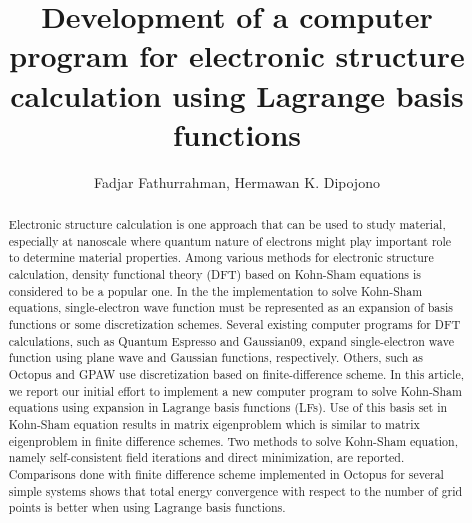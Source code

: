 \documentclass[%
reprint,
amsmath,
amssymb,
aps]{revtex4-1}
\begin{document}
\title{Development of a computer program for electronic structure calculation using Lagrange basis functions}
\author{Fadjar Fathurrahman, Hermawan K. Dipojono}

\begin{abstract}
Electronic structure calculation is one approach that can be used to study material,
especially at nanoscale where quantum nature of electrons might play important role
to determine material properties. Among various methods for electronic structure calculation,
density functional theory (DFT) based on Kohn-Sham equations is considered to be a popular one.
In the the implementation to solve Kohn-Sham equations, single-electron wave function must be
represented as an expansion of basis functions or some discretization schemes. Several
existing computer programs for DFT calculations, such as  Quantum Espresso and Gaussian09,
expand single-electron wave function using plane wave and Gaussian functions, respectively.
Others, such as Octopus and GPAW use discretization based on finite-difference scheme.
In this article, we report our initial effort to implement a new computer program to
solve Kohn-Sham equations using expansion in Lagrange basis functions (LFs).
Use of this basis set in Kohn-Sham equation results in matrix eigenproblem which
is similar to matrix eigenproblem in finite difference schemes. Two methods to solve
Kohn-Sham equation, namely self-consistent field iterations and direct minimization,
are reported. Comparisons done with finite difference scheme implemented in Octopus
for several simple systems shows that total energy convergence with respect to the number
of grid points is better when using Lagrange basis functions.
\end{abstract}

\maketitle











\end{document}
